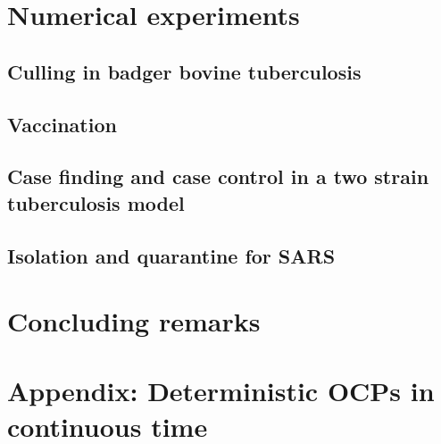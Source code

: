 \documentclass[11pt]{amsart}
\theoremstyle{definition}
\numberwithin{equation}{section}
\begin{document}
  \section{Numerical experiments}
    \subsection{Culling in badger bovine tuberculosis}
      
    \subsection{Vaccination}
      
    \subsection{Case finding and case control 
      in a two strain tuberculosis model}
      
    \subsection{Isolation and quarantine for SARS} 
      
%
  \section{Concluding remarks}
   
  \section{Appendix: Deterministic OCPs in continuous time}
    
%
  
  
\end{document}
